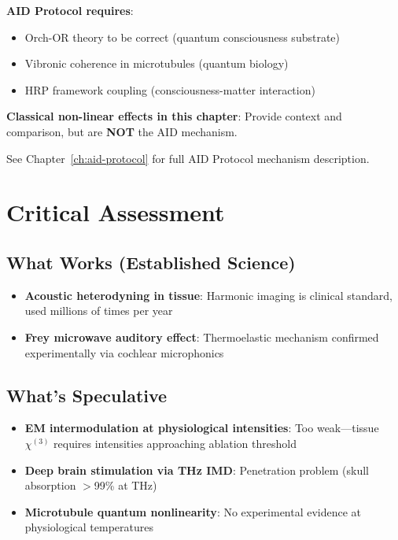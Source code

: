 \textbf{AID Protocol requires}:
\begin{itemize}
\item Orch-OR theory to be correct (quantum consciousness substrate)
\item Vibronic coherence in microtubules (quantum biology)
\item HRP framework coupling (consciousness-matter interaction)
\end{itemize}

\textbf{Classical non-linear effects in this chapter}: Provide context and comparison, but are \textbf{NOT} the AID mechanism.

See Chapter~\ref{ch:aid-protocol} for full AID Protocol mechanism description.

\section{Critical Assessment}

\subsection*{What Works (Established Science)}
\begin{itemize}
\item \textbf{Acoustic heterodyning in tissue}: Harmonic imaging is clinical standard, used millions of times per year
\item \textbf{Frey microwave auditory effect}: Thermoelastic mechanism confirmed experimentally via cochlear microphonics
\end{itemize}

\subsection*{What's Speculative}
\begin{itemize}
\item \textbf{EM intermodulation at physiological intensities}: Too weak---tissue $\chi^{(3)}$ requires intensities approaching ablation threshold
\item \textbf{Deep brain stimulation via THz IMD}: Penetration problem (skull absorption $>$99\% at THz)
\item \textbf{Microtubule quantum nonlinearity}: No experimental evidence at physiological temperatures
\end{itemize}


